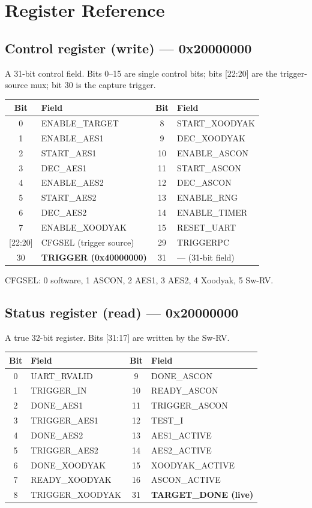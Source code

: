 \documentclass[11pt,a4paper]{report}
\newcommand{\code}[1]{{\ttfamily\small #1}}
\begin{document}
\chapter{Register Reference}
\section{Control register (write) --- \code{0x20000000}}
A 31-bit control field. Bits 0--15 are single control bits;
bits [22:20] are the trigger-source mux; bit 30 is the capture trigger.
\begin{center}
\begin{longtable}{clcl}
\toprule
Bit & Field & Bit & Field \\ \midrule\endhead
0 & ENABLE\_TARGET & 8 & START\_XOODYAK \\
1 & ENABLE\_AES1 & 9 & DEC\_XOODYAK \\
2 & START\_AES1 & 10 & ENABLE\_ASCON \\
3 & DEC\_AES1 & 11 & START\_ASCON \\
4 & ENABLE\_AES2 & 12 & DEC\_ASCON \\
5 & START\_AES2 & 13 & ENABLE\_RNG \\
6 & DEC\_AES2 & 14 & ENABLE\_TIMER \\
7 & ENABLE\_XOODYAK & 15 & RESET\_UART \\
\rowcolor{pblue!15} {[22:20]} & CFGSEL (trigger source) & 29 & TRIGGERPC \\
\rowcolor{pblue!15} 30 & \textbf{TRIGGER (0x40000000)} & 31 & --- (31-bit field) \\
\bottomrule
\end{longtable}\end{center}
\code{CFGSEL}: 0 software, 1 ASCON, 2 AES1, 3 AES2, 4 Xoodyak, 5 Sw-RV.

\section{Status register (read) --- \code{0x20000000}}
A true 32-bit register. Bits [31:17] are written by the Sw-RV.
\begin{center}
\begin{longtable}{clcl}
\toprule
Bit & Field & Bit & Field \\ \midrule\endhead
0 & UART\_RVALID & 9 & DONE\_ASCON \\
1 & TRIGGER\_IN & 10 & READY\_ASCON \\
2 & DONE\_AES1 & 11 & TRIGGER\_ASCON \\
3 & TRIGGER\_AES1 & 12 & TEST\_I \\
4 & DONE\_AES2 & 13 & AES1\_ACTIVE \\
5 & TRIGGER\_AES2 & 14 & AES2\_ACTIVE \\
6 & DONE\_XOODYAK & 15 & XOODYAK\_ACTIVE \\
7 & READY\_XOODYAK & 16 & ASCON\_ACTIVE \\
8 & TRIGGER\_XOODYAK & \cellcolor{tip!15}31 & \cellcolor{tip!15}\textbf{TARGET\_DONE (live)} \\
\bottomrule
\end{longtable}\end{center}
\end{document}
